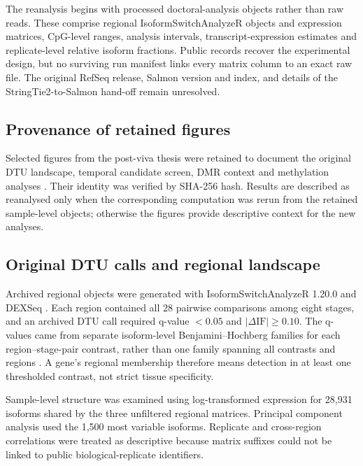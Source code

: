 \documentclass[11pt,a4paper]{article}
\newcommand{\dIF}{\ensuremath{\Delta\mathrm{IF}}}
\begin{document}
The reanalysis begins with processed doctoral-analysis objects rather than raw reads. These comprise regional IsoformSwitchAnalyzeR objects and expression matrices, CpG-level ranges, analysis intervals, transcript-expression estimates and replicate-level relative isoform fractions. Public records recover the experimental design, but no surviving run manifest links every matrix column to an exact raw file. The original RefSeq release, Salmon version and index, and details of the StringTie2-to-Salmon hand-off remain unresolved.

\subsection{Provenance of retained figures}

Selected figures from the post-viva thesis were retained to document the original DTU landscape, temporal candidate screen, DMR context and methylation analyses \citep{gounder_thesis_2025}. Their identity was verified by SHA-256 hash. Results are described as reanalysed only when the corresponding computation was rerun from the retained sample-level objects; otherwise the figures provide descriptive context for the new analyses.

\subsection{Original DTU calls and regional landscape}

Archived regional objects were generated with IsoformSwitchAnalyzeR 1.20.0 \citep{vitting_isoformswitchanalyzer_2019} and DEXSeq \citep{anders_dexseq_2012}. Each region contained all 28 pairwise comparisons among eight stages, and an archived DTU call required q-value $<0.05$ and $|\dIF|\geq0.10$. The q-values came from separate isoform-level Benjamini--Hochberg families for each region--stage-pair contrast, rather than one family spanning all contrasts and regions \citep{benjamini_hochberg_1995}. A gene's regional membership therefore means detection in at least one thresholded contrast, not strict tissue specificity.

Sample-level structure was examined using log-transformed expression for 28,931 isoforms shared by the three unfiltered regional matrices. Principal component analysis used the 1,500 most variable isoforms. Replicate and cross-region correlations were treated as descriptive because matrix suffixes could not be linked to public biological-replicate identifiers.
\end{document}
